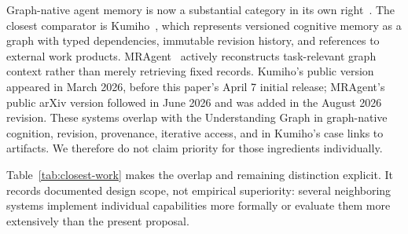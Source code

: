 Graph-native agent memory is now a substantial category in its own right~\cite{yang2026graphmemory}. The closest comparator is Kumiho~\cite{park2026kumiho}, which represents versioned cognitive memory as a graph with typed dependencies, immutable revision history, and references to external work products. MRAgent~\cite{ji2026mragent} actively reconstructs task-relevant graph context rather than merely retrieving fixed records. Kumiho's public version appeared in March 2026, before this paper's April 7 initial release; MRAgent's public arXiv version followed in June 2026 and was added in the August 2026 revision. These systems overlap with the Understanding Graph in graph-native cognition, revision, provenance, iterative access, and in Kumiho's case links to artifacts. We therefore do not claim priority for those ingredients individually.

Table~\ref{tab:closest-work} makes the overlap and remaining distinction explicit. It records documented design scope, not empirical superiority: several neighboring systems implement individual capabilities more formally or evaluate them more extensively than the present proposal.

